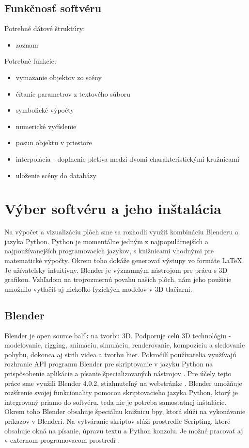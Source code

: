 \subsection{Funkčnosť softvéru} 
Potrebné dátové štruktúry:
\begin{itemize}
	\item zoznam
\end{itemize}
Potrebné funkcie:
\begin{itemize}
	\item vymazanie objektov zo scény 
    \item čítanie parametrov z textového súboru
    \item symbolické výpočty
    \item numerické vyčíslenie
    \item posun objektu v priestore
    \item interpolácia - doplnenie pletiva medzi dvomi charakteristickými kružnicami
    \item uloženie scény do databázy
\end{itemize}
\section{Výber softvéru a jeho inštalácia}
Na výpočet a vizualizáciu plôch sme sa rozhodli využiť kombináciu Blenderu a jazyka Python. Python je momentálne jedným z najpopulárnejších a najpoužívanejších programovacích jazykov, s knižnicami vhodnými pre matematické výpočty. Okrem toho dokáže generovať výstupy vo formáte \LaTeX. Je užívateľsky intuitívny. Blender je významným nástrojom pre prácu s 3D grafikou. Vzhľadom na trojrozmernú povahu našich plôch, nám jeho použitie umožnilo vytlačiť aj niekoľko fyzických modelov v 3D tlačiarni.
\subsection{Blender}
Blender je open source balík na tvorbu 3D. Podporuje celú 3D technológiu - modelovanie, rigging, animáciu, simuláciu, renderovanie, kompozíciu a sledovanie pohybu, dokonca aj strih videa a tvorbu hier. Pokročilí používatelia využívajú rozhranie API programu Blender pre skriptovanie v jazyku Python na prispôsobenie aplikácie a písanie špecializovaných nástrojov \cite{Blender}. Pre účely tejto práce sme využili Blender 4.0.2, stiahnuteľný na webstránke \cite{BlenderDownload}. Blender umožňuje rozšírenie svojej funkcionality pomocou skriptovacieho jazyka Python, ktorý je integrovaný priamo do softvéru, teda nie je potreba samostatnej inštalácie. Okrem toho Blender obsahuje špeciálnu knižnicu bpy, ktorá slúži na vykonávanie príkazov v Blenderi. Na vytváranie skriptov slúži prostredie Scripting, ktoré obsahuje okná na písanie, úpravu textu a Python konzolu. Je možné pracovať aj v externom programovacom prostredí \cite{BlenderAPI}.

